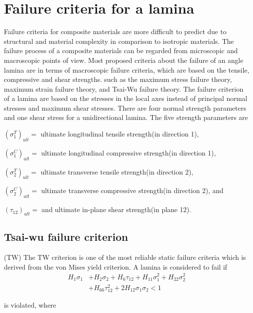 \section{Failure criteria for a lamina}

Failure criteria for composite materials are more difficult to predict due to
structural and material complexity in comparison to isotropic materials. The
failure process of a composite materials can be regarded from microscopic and
macroscopic points of view. Most proposed criteria about the failure of an angle
lamina are in terms of macroscopic failure criteria, which are based on the
tensile, compressive and shear strengths.  such as the maximum stress failure
theory, maximum strain failure theory, and Tsai-Wu failure theory. The failure
criterion of a lamina are based on the stresses in the local axes instead of
principal normal stresses and maximum shear stresses. There are four normal
strength parameters and one shear stress for a unidirectional lamina. The five
strength parameters are

$(\sigma _1^{T})_{ult}= $ ultimate longitudinal tensile strength(in direction 1),

$(\sigma _1^{C})_{ult}= $ ultimate longitudinal compressive strength(in direction 1),

$(\sigma _2^{T})_{ult}= $ ultimate transverse tensile strength(in direction 2),

$(\sigma _2^{C})_{ult}= $ ultimate transverse compressive strength(in direction 2), and

$(\tau_{12})_{ult}= $ and ultimate in-plane shear strength(in plane 12).

\subsection{Tsai-wu failure criterion}(TW)
The TW criterion is one of the most reliable static failure criteria which is derived from the von
Mises yield criterion.  
A lamina is considered to fail
if \begin{equation} \label{eq:tsai_wu}
\begin{split}
	H_1 \sigma_1  & + H_2 \sigma_2 + H_6 \tau_{12} + H_{11}\sigma_1^2 + H_{22} \sigma_2^2 \\
				  & + H_{66}  \tau_{12}^2 + 2H_{12}\sigma_1\sigma_2 < 1
\end{split}
\end{equation}

is violated, where

